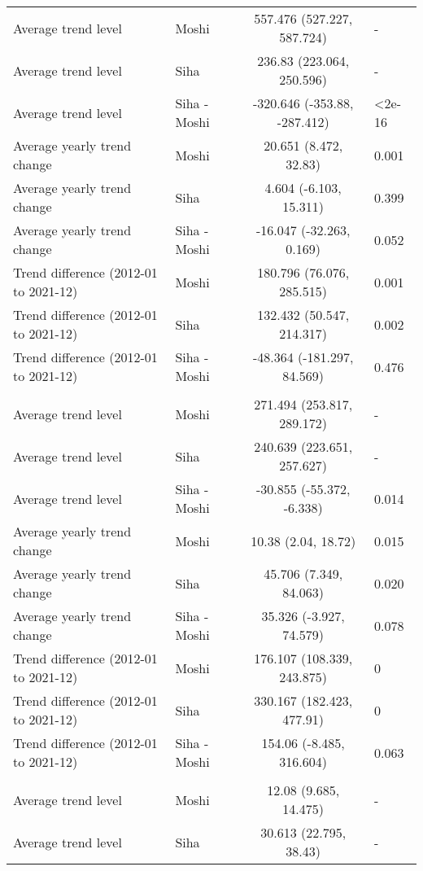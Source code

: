 \begin{longtable}{l|lcl}
\midrule\addlinespace[2.5pt]
Average trend level & Moshi & 557.476 (527.227, 587.724) & - \\ 
Average trend level & Siha & 236.83 (223.064, 250.596) & - \\ 
Average trend level & Siha - Moshi & -320.646 (-353.88, -287.412) & <2e-16 \\ 
Average yearly trend change & Moshi & 20.651 (8.472, 32.83) & 0.001 \\ 
Average yearly trend change & Siha & 4.604 (-6.103, 15.311) & 0.399 \\ 
Average yearly trend change & Siha - Moshi & -16.047 (-32.263, 0.169) & 0.052 \\ 
Trend difference (2012-01 to 2021-12) & Moshi & 180.796 (76.076, 285.515) & 0.001 \\ 
Trend difference (2012-01 to 2021-12) & Siha & 132.432 (50.547, 214.317) & 0.002 \\ 
Trend difference (2012-01 to 2021-12) & Siha - Moshi & -48.364 (-181.297, 84.569) & 0.476 \\ 
\midrule\addlinespace[2.5pt]
\multicolumn{4}{l}{Diarrhea With No Dehydration} \\ 
\midrule\addlinespace[2.5pt]
Average trend level & Moshi & 271.494 (253.817, 289.172) & - \\ 
Average trend level & Siha & 240.639 (223.651, 257.627) & - \\ 
Average trend level & Siha - Moshi & -30.855 (-55.372, -6.338) & 0.014 \\ 
Average yearly trend change & Moshi & 10.38 (2.04, 18.72) & 0.015 \\ 
Average yearly trend change & Siha & 45.706 (7.349, 84.063) & 0.020 \\ 
Average yearly trend change & Siha - Moshi & 35.326 (-3.927, 74.579) & 0.078 \\ 
Trend difference (2012-01 to 2021-12) & Moshi & 176.107 (108.339, 243.875) & 0 \\ 
Trend difference (2012-01 to 2021-12) & Siha & 330.167 (182.423, 477.91) & 0 \\ 
Trend difference (2012-01 to 2021-12) & Siha - Moshi & 154.06 (-8.485, 316.604) & 0.063 \\ 
\midrule\addlinespace[2.5pt]
\multicolumn{4}{l}{Diarrhea With Severe Dehydration} \\ 
\midrule\addlinespace[2.5pt]
Average trend level & Moshi & 12.08 (9.685, 14.475) & - \\ 
Average trend level & Siha & 30.613 (22.795, 38.43) & - \\ 

\end{longtable}
